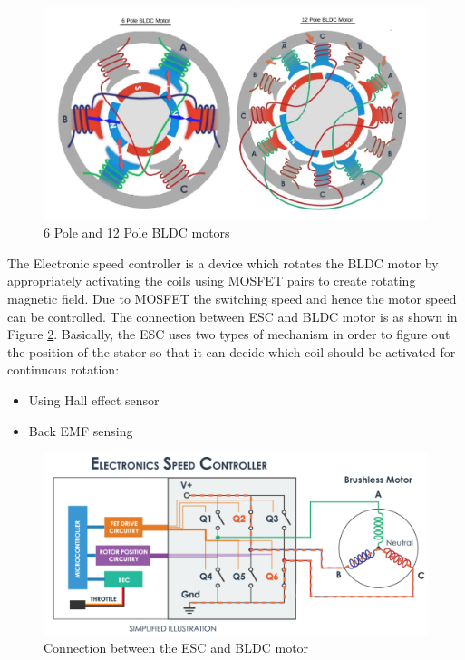 \begin{figure}[h!]
\centering
\includegraphics[width=12cm]{./Figures/BLDC_pole.jpg}
\caption{6 Pole and 12 Pole BLDC motors}
\label{BLDC_pole}
\end{figure}

The Electronic speed controller is a device which rotates the BLDC motor by appropriately activating the coils using MOSFET pairs to create rotating magnetic field. Due to MOSFET the switching speed and hence the motor speed can be controlled. The connection between ESC and BLDC motor is as shown in Figure \ref{ESC_BLDC_connection}. Basically, the ESC uses two types of mechanism in order to figure out the position of the stator so that it can decide which coil should be activated for continuous rotation:
\begin{itemize}
    \item Using Hall effect sensor
    \item Back EMF sensing
\end{itemize}

\begin{figure}[h!]
\centering
\includegraphics[width=14cm]{./Figures/ESC_BLDC_connection.png}
\caption{Connection between the ESC and BLDC motor}
\label{ESC_BLDC_connection}
\end{figure}

